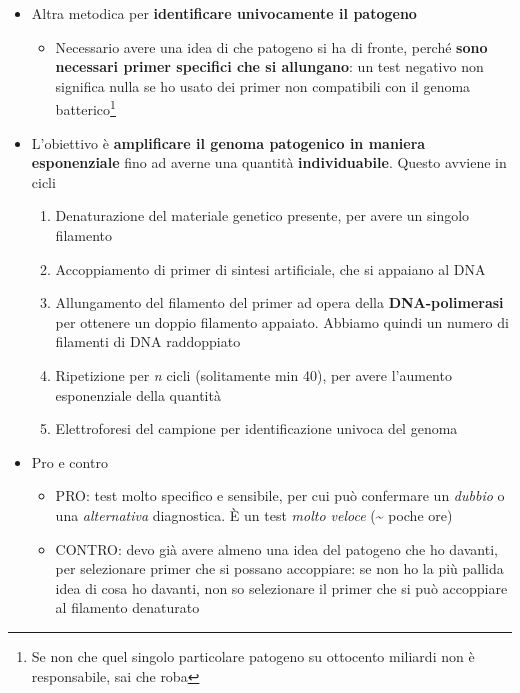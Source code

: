 \documentclass[italian,]{article}
\providecommand{\tightlist}{%
  \setlength{\itemsep}{0pt}\setlength{\parskip}{0pt}}
\begin{document}
\begin{itemize}
\tightlist
\item
  Altra metodica per \textbf{identificare univocamente il patogeno}

  \begin{itemize}
  \tightlist
  \item
    Necessario avere una idea di che patogeno si ha di fronte, perché
    \textbf{sono necessari primer specifici che si allungano}: un test
    negativo non significa nulla se ho usato dei primer non compatibili
    con il genoma batterico\footnote{Se non che quel singolo particolare
      patogeno su ottocento miliardi non è responsabile, sai che roba}
  \end{itemize}
\item
  L'obiettivo è \textbf{amplificare il genoma patogenico in maniera
  esponenziale} fino ad averne una quantità \textbf{individuabile}.
  Questo avviene in cicli

  \begin{enumerate}
  \def\labelenumi{\arabic{enumi}.}
  \tightlist
  \item
    Denaturazione del materiale genetico presente, per avere un singolo
    filamento
  \item
    Accoppiamento di primer di sintesi artificiale, che si appaiano al
    DNA
  \item
    Allungamento del filamento del primer ad opera della
    \textbf{DNA-polimerasi} per ottenere un doppio filamento appaiato.
    Abbiamo quindi un numero di filamenti di DNA raddoppiato
  \item
    Ripetizione per \emph{n} cicli (solitamente min 40), per avere
    l'aumento esponenziale della quantità
  \item
    Elettroforesi del campione per identificazione univoca del genoma
  \end{enumerate}
\item
  Pro e contro

  \begin{itemize}
  \tightlist
  \item
    PRO: test molto specifico e sensibile, per cui può confermare un
    \emph{dubbio} o una \emph{alternativa} diagnostica. È un test
    \emph{molto veloce} (\textasciitilde{} poche ore)
  \item
    CONTRO: devo già avere almeno una idea del patogeno che ho davanti,
    per selezionare primer che si possano accoppiare: se non ho la più
    pallida idea di cosa ho davanti, non so selezionare il primer che si
    può accoppiare al filamento denaturato
  \end{itemize}
\end{itemize}
\end{document}
